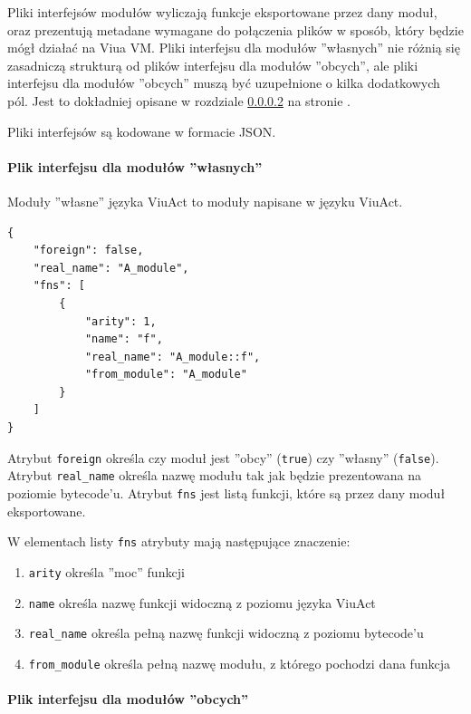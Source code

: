 \documentclass[11pt,oneside,a4paper,titlepage,onecolumn]{article}
\begin{document}
Pliki interfejsów modułów wyliczają funkcje eksportowane przez dany moduł, oraz prezentują metadane wymagane
do połączenia plików w sposób, który będzie mógł działać na Viua VM. Pliki interfejsu dla modułów ''własnych''
nie różnią się zasadniczą strukturą od plików interfejsu dla modułów ''obcych'', ale pliki interfejsu dla
modułów ''obcych'' muszą być uzupełnione o kilka dodatkowych pól. Jest to dokładniej opisane w rozdziale
\ref{pliki_interfejsow_modulow_obcych} na stronie \pageref{pliki_interfejsow_modulow_obcych}.

Pliki interfejsów są kodowane w formacie JSON.

\paragraph{Plik interfejsu dla modułów ''własnych''}

Moduły ''własne'' języka ViuAct to moduły napisane w języku ViuAct.

\begin{lstlisting}
{
    "foreign": false,
    "real_name": "A_module",
    "fns": [
        {
            "arity": 1,
            "name": "f",
            "real_name": "A_module::f",
            "from_module": "A_module"
        }
    ]
}
\end{lstlisting}

Atrybut \texttt{foreign} określa czy moduł jest ''obcy'' (\texttt{true}) czy ''własny'' (\texttt{false}).
Atrybut \texttt{real\_name} określa nazwę modułu tak jak będzie prezentowana na poziomie bytecode'u.
Atrybut \texttt{fns} jest listą funkcji, które są przez dany moduł eksportowane.

W elementach listy \texttt{fns} atrybuty mają następujące znaczenie:

\begin{enumerate}
    \item \texttt{arity} określa ''moc'' funkcji
    \item \texttt{name} określa nazwę funkcji widoczną z poziomu języka ViuAct
    \item \texttt{real\_name} określa pełną nazwę funkcji widoczną z poziomu bytecode'u
    \item \texttt{from\_module} określa pełną nazwę modułu, z którego pochodzi dana funkcja
\end{enumerate}

\paragraph{Plik interfejsu dla modułów ''obcych''}
\label{pliki_interfejsow_modulow_obcych}
\end{document}

